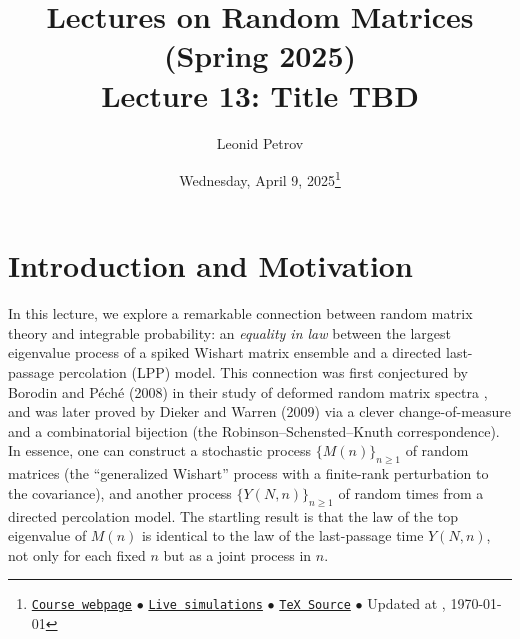 \documentclass[letterpaper,11pt,oneside,reqno]{article}
\numberwithin{equation}{section}
\theoremstyle{definition}
\begin{document}
\title{Lectures on Random Matrices
(Spring 2025)
\\Lecture 13: Title TBD}


\date{Wednesday, April 9, 2025\footnote{\href{https://lpetrov.cc/rmt25/}{\texttt{Course webpage}}
$\bullet$ \href{https://lpetrov.cc/simulations/model/random-matrices/}{\texttt{Live simulations}}
$\bullet$ \href{https://lpetrov.cc/rmt25/rmt25-notes/rmt2025-l13.tex}{\texttt{TeX Source}}
$\bullet$
Updated at \currenttime, \today}}



\author{Leonid Petrov}


\maketitle



\section{Introduction and Motivation}
In this lecture, we explore a remarkable connection between random matrix theory and integrable probability: an \emph{equality in law} between the largest eigenvalue process of a spiked Wishart matrix ensemble and a directed last-passage percolation (LPP) model. This connection was first conjectured by Borodin and P\'ech\'e (2008) in their study of deformed random matrix spectra \cite{BorodinPeche2008}, and was later proved by Dieker and Warren (2009) \cite{DiekerWarren2009} via a clever change-of-measure and a combinatorial bijection (the Robinson--Schensted--Knuth correspondence). In essence, one can construct a stochastic process $\{M(n)\}_{n\ge1}$ of random matrices (the ``generalized Wishart'' process with a finite-rank perturbation to the covariance), and another process $\{Y(N,n)\}_{n\ge1}$ of random times from a directed percolation model. The startling result is that the law of the top eigenvalue of $M(n)$ is identical to the law of the last-passage time $Y(N,n)$, not only for each fixed $n$ but as a joint process in $n$.
\end{document}
